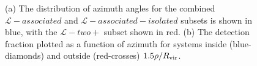 \documentclass[twocolumn,tighten]{aastex62}
\begin{document}

\begin{figure}[ht!]
        \centering
        \vspace{0pt}
        
        \caption{\small{(a) The distribution of azimuth angles for the combined $\mathcal{L}-associated$ and $\mathcal{L}-associated-isolated$ subsets is shown in blue, with the $\mathcal{L}-two+$ subset shown in red. (b) The detection fraction plotted as a function of azimuth for systems inside (blue-diamonds) and outside (red-crosses) $1.5 \rho / R_{\rm vir}$.}}
        \vspace{5pt}
        \label{detection_fraction_inc_both}
\end{figure}
\end{document}
